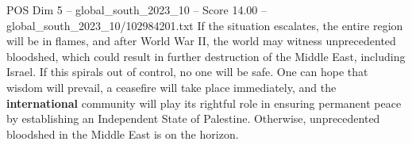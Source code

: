 \begin{textsample}{POS Dim 5 – global\_south\_2023\_10 – Score 14.00 – global\_south\_2023\_10/102984201.txt}
If the situation escalates, the entire region will be in flames, and after World War II, the world may witness unprecedented bloodshed, which could result in further destruction of the Middle East, including Israel.
If this spirals out of control, no one will be safe.
One can hope that wisdom will prevail, a ceasefire will take place immediately, and the \textbf{international} community will play its rightful role in ensuring permanent peace by establishing an Independent State of Palestine.
Otherwise, unprecedented bloodshed in the Middle East is on the horizon.

\end{textsample}
